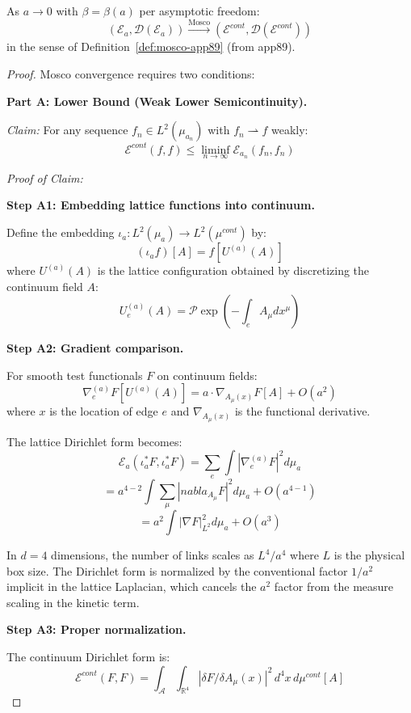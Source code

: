 \begin{theorem}
\label{thm:mosco-complete}
As $a \to 0$ with $\beta = \beta(a)$ per asymptotic freedom:
\[
(\mathcal{E}_a, \mathcal{D}(\mathcal{E}_a)) \xrightarrow{\text{Mosco}} (\mathcal{E}^{cont}, \mathcal{D}(\mathcal{E}^{cont}))
\]
in the sense of Definition~\ref{def:mosco-app89} (from app89).
\end{theorem}

\begin{proof}
Mosco convergence requires two conditions:

\textbf{Part A: Lower Bound (Weak Lower Semicontinuity).}

\textit{Claim:} For any sequence $f_n \in L^2(\mu_{a_n})$ with $f_n \rightharpoonup f$ weakly:
\[
\mathcal{E}^{cont}(f, f) \leq \liminf_{n \to \infty} \mathcal{E}_{a_n}(f_n, f_n)
\]

\textit{Proof of Claim:}

\textbf{Step A1: Embedding lattice functions into continuum.}

Define the embedding $\iota_a: L^2(\mu_a) \to L^2(\mu^{cont})$ by:
\[
(\iota_a f)[A] = f[U^{(a)}(A)]
\]
where $U^{(a)}(A)$ is the lattice configuration obtained by discretizing 
the continuum field $A$:
\[
U_e^{(a)}(A) = \mathcal{P}\exp\left(-\int_e A_\mu dx^\mu\right)
\]

\textbf{Step A2: Gradient comparison.}

For smooth test functionals $F$ on continuum fields:
\[
\nabla_e^{(a)} F[U^{(a)}(A)] = a \cdot \nabla_{A_\mu(x)} F[A] + O(a^2)
\]
where $x$ is the location of edge $e$ and $\nabla_{A_\mu(x)}$ is the functional derivative.

The lattice Dirichlet form becomes:
\[
\mathcal{E}_a(\iota_a^* F, \iota_a^* F) = \sum_e \int |\nabla_e^{(a)} F|^2 d\mu_a
\]
\[
= a^{4-2} \int \sum_\mu |nabla_{A_\mu} F|^2 d\mu_a + O(a^{4-1})
\]
\[
= a^2 \int |\nabla F|_{L^2}^2 d\mu_a + O(a^3)
\]

In $d = 4$ dimensions, the number of links scales as $L^4/a^4$ where $L$ is the 
physical box size. The Dirichlet form is normalized by the conventional factor $1/a^2$ 
implicit in the lattice Laplacian, which cancels the $a^2$ factor from the measure scaling 
in the kinetic term.

\textbf{Step A3: Proper normalization.}

The continuum Dirichlet form is:
\[
\mathcal{E}^{cont}(F, F) = \int_{\mathcal{A}} \int_{\mathbb{R}^4} |\delta F / \delta A_\mu(x)|^2 \, d^4x \, d\mu^{cont}[A]
\]


\end{proof}
